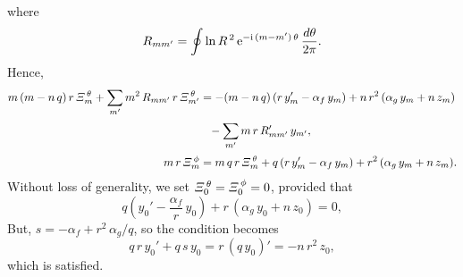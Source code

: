 \documentclass[12pt,prb,aps,notitlepage]{revtex4-1}
\begin{document}
where
\begin{equation}
R_{mm'} = \oint \ln R^{\,2}\,{\rm e}^{-{\rm i}\,(m-m')\,\theta}\,\frac{d\theta}{2\pi}.
\end{equation}
Hence,
\begin{align}
m\,(m-n\,q)\,r\,{\mit\Xi}_m^{\,\theta} + \sum_{m'}m^2\,R_{mm'}\,r\,{\mit\Xi}_{m'}^{\,\theta}&= -(m-n\,q)\left(r\,y_m' -\alpha_f\,y_m\right)+n\,r^2\,(\alpha_g\,y_m+n\,z_m)\nonumber\\[0.5ex]&\phantom{=}-
\sum_{m'}m\,r\,R_{mm'}'\,y_{m'} ,\\[0.5ex]
m\,r\,{\mit\Xi}_m^{\,\phi} &= m\,q\,r\,{\mit\Xi}_m^{\,\theta} +q\left(r\,y_m' -\alpha_f \,y_m\right)+r^2\,(\alpha_g\,y_m+n\,z_m).
\end{align}
Without loss of generality, we set ${\mit\Xi}_0^{\,\theta}= {\mit\Xi}_0^{\,\phi}=0$, provided that
\begin{equation}
q\left(y_0'-\frac{\alpha_f}{r}\,y_0\right) +r\,(\alpha_g\,y_0+n\,z_0) = 0,
\end{equation}
But, $s=-\alpha_f+r^2\,\alpha_g/q$, so the condition becomes
\begin{equation}
q\,r\,y_0' + q\,s\,y_0= r\,(q\,y_0)' = -n\,r^2\,z_0,
\end{equation}
which is satisfied. 
\end{document}
